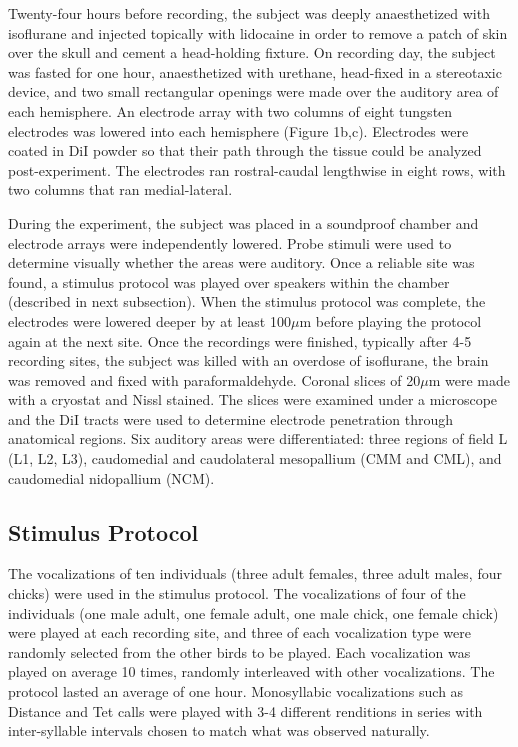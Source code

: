     Twenty-four hours before recording, the subject was deeply anaesthetized with isoflurane and injected topically with lidocaine in order to remove a patch of skin over the skull and cement a  head-holding fixture. On recording day, the subject was fasted for one hour, anaesthetized with urethane, head-fixed in a stereotaxic device, and two small rectangular openings were made over the auditory area of each hemisphere. An electrode array with two columns of eight tungsten electrodes was lowered into each hemisphere (Figure 1b,c). Electrodes were coated in DiI powder so that their path through the tissue could be analyzed post-experiment. The electrodes ran rostral-caudal lengthwise in eight rows, with two columns that ran medial-lateral.

    During the experiment, the subject was placed in a soundproof chamber and electrode arrays were independently lowered. Probe stimuli were used to determine visually whether the areas were auditory. Once a reliable site was found, a stimulus protocol was played over speakers within the chamber (described in next subsection). When the stimulus protocol was complete, the electrodes were lowered deeper by at least 100$\mu$m before playing the protocol again at the next site.
Once the recordings were finished, typically after 4-5 recording sites, the subject was killed with an overdose of isoflurane, the brain was removed and fixed with paraformaldehyde. Coronal slices of 20$\mu$m were made with a cryostat and Nissl stained. The slices were examined under a microscope and the DiI tracts were used to determine electrode penetration through anatomical regions. Six auditory areas were differentiated: three regions of field L (L1, L2, L3), caudomedial and caudolateral mesopallium (CMM and CML), and caudomedial nidopallium (NCM).


\subsection{Stimulus Protocol}

    The vocalizations of ten individuals (three adult females, three adult males, four chicks) were used in the stimulus protocol. The vocalizations of four of the individuals (one male adult, one female adult, one male chick, one female chick) were played at each recording site, and three of each vocalization type were randomly selected from the other birds to be played. Each vocalization was played on average 10 times, randomly interleaved with other vocalizations. The protocol lasted an average of one hour. Monosyllabic vocalizations such as Distance and Tet calls were played with 3-4 different renditions in series with inter-syllable intervals chosen to match what was observed naturally.


